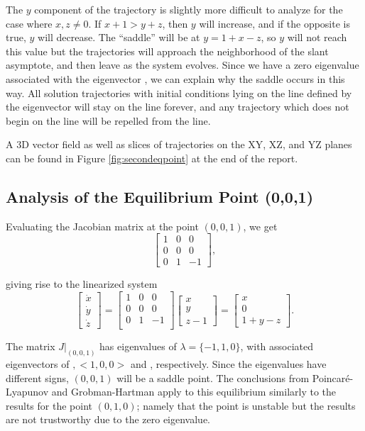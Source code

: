 \documentclass[10pt]{article}
\begin{document}
The \(y\) component of the trajectory is slightly more difficult to analyze for the case where \(x,z\neq 0\). If \(x+1>y+z\), then \(y\) will increase, and if the opposite is true, \(y\) will decrease. The ``saddle'' will be at \(y=1+x-z\), so \(y\) will not reach this value but the trajectories will approach the neighborhood of the slant asymptote, and then leave as the system evolves. Since we have a zero eigenvalue associated with the eigenvector \(<1,1,0>\), we can explain why the saddle occurs in this way. All solution trajectories with initial conditions lying on the line defined by the eigenvector will stay on the line forever, and any trajectory which does not begin on the line will be repelled from the line.

A 3D vector field as well as slices of trajectories on the XY, XZ, and YZ planes can be found in Figure \ref{fig:secondeqpoint} at the end of the report.

\subsection{Analysis of the Equilibrium Point (0,0,1)}

Evaluating the Jacobian matrix at the point \((0,0,1)\), we get 
\[
\left[ 
\begin{array}{ccc}
1 & 0 & 0 \\
0 & 0 & 0 \\
0 & 1 & -1 
\end{array}
\right],
\]

giving rise to the linearized system
\[
\begin{bmatrix}
\dot{x} \\ \dot{y} \\ \dot{z}
\end{bmatrix} = 
\left[ 
\begin{array}{ccc}
1 & 0 & 0 \\
0 & 0 & 0 \\
0 & 1 & -1 \\
\end{array}
\right]
\begin{bmatrix}
x \\ y  \\ z-1
\end{bmatrix} =
\begin{bmatrix}
x \\ 0 \\ 1+y-z
\end{bmatrix}.
\]

The matrix \(J|_{(0,0,1)}\) has eigenvalues of \(\lambda = \{-1,1,0\}\), with associated eigenvectors of \(<0,0,1>,<1,0,0>\) and \(<0,1,1>\), respectively. Since the eigenvalues have different signs, \( (0,0,1) \) will be a saddle point. The conclusions from Poincar\'{e}-Lyapunov and Grobman-Hartman apply to this equilibrium similarly to the results for the point \((0,1,0)\); namely that the point is unstable but the results are not trustworthy due to the zero eigenvalue. 
\end{document}
